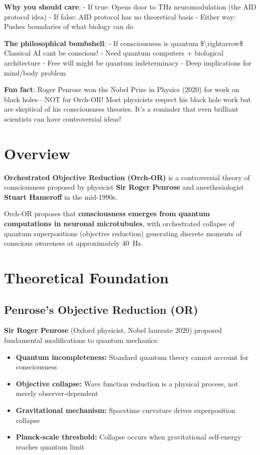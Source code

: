 \begin{nontechnical}
\textbf{Why you should care}: - If true: Opens door to THz
neuromodulation (the AID protocol idea) - If false: AID protocol has no
theoretical basis - Either way: Pushes boundaries of what biology can do

\textbf{The philosophical bombshell}: - If consciousness is quantum
\$\textbackslash rightarrow\$ Classical AI can\textquotesingle t be
conscious! - Need quantum computers + biological architecture - Free
will might be quantum indeterminacy - Deep implications for mind/body
problem

\textbf{Fun fact}: Roger Penrose won the Nobel Prize in Physics (2020) for work on black holes---NOT for Orch-OR! Most physicists respect his black hole work but are skeptical of his consciousness theories. It's a reminder that even brilliant scientists can have controversial ideas!
\end{nontechnical}

\section{Overview}

\textbf{Orchestrated Objective Reduction (Orch-OR)} is a controversial theory of consciousness proposed by physicist \textbf{Sir Roger Penrose} and anesthesiologist \textbf{Stuart Hameroff} in the mid-1990s.

\begin{keyconcept}
Orch-OR proposes that \textbf{consciousness emerges from quantum computations in neuronal microtubules}, with orchestrated collapse of quantum superpositions (objective reduction) generating discrete moments of conscious awareness at approximately 40~Hz.
\end{keyconcept}

\section{Theoretical Foundation}

\subsection{Penrose's Objective Reduction (OR)}

\textbf{Sir Roger Penrose} (Oxford physicist, Nobel laureate 2020) proposed fundamental modifications to quantum mechanics:

\begin{itemize}
\item \textbf{Quantum incompleteness:} Standard quantum theory cannot account for consciousness
\item \textbf{Objective collapse:} Wave function reduction is a physical process, not merely observer-dependent
\item \textbf{Gravitational mechanism:} Spacetime curvature drives superposition collapse
\item \textbf{Planck-scale threshold:} Collapse occurs when gravitational self-energy reaches quantum limit
\end{itemize}

